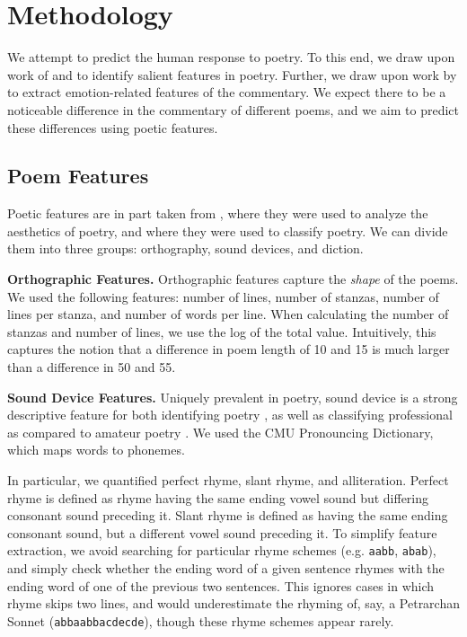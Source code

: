 \documentclass[11pt]{article}
\newcommand{\slimparagraph}[1]{
\vspace{4pt} %
\textbf{#1.}\quad}
\begin{document}
\section{Methodology}
We attempt to predict the human response to poetry. To this end, we draw upon work of  and  to identify salient features in poetry. Further, we draw upon work by  to extract emotion-related features of the commentary. We expect there to be a noticeable difference in the commentary of different poems, and we aim to predict these differences using poetic features.

\subsection{Poem Features}
Poetic features are in part taken from , where they were used to analyze the aesthetics of poetry, and  where they were used to classify poetry. We can divide them into three groups: orthography, sound devices, and diction.

\slimparagraph{Orthographic Features}
Orthographic features capture the \emph{shape} of the poems. We used the following features: number of lines, number of stanzas, number of lines per stanza, and number of words per line. When calculating the number of stanzas and number of lines, we use the log of the total value. Intuitively, this captures the notion that a difference in poem length of 10 and 15 is much larger than a difference in 50 and 55.

\slimparagraph{Sound Device Features}
Uniquely prevalent in poetry, sound device is a strong descriptive feature for both identifying poetry \cite{tizhoosh2008poetic}, as well as classifying professional as compared to amateur poetry \cite{kao2012computational}. We used the CMU Pronouncing Dictionary, which maps words to phonemes.

In particular, we quantified perfect rhyme, slant rhyme, and alliteration. Perfect rhyme is defined as rhyme having the same ending vowel sound but differing consonant sound preceding it. Slant rhyme is defined as having the same ending consonant sound, but a different vowel sound preceding it. To simplify feature extraction, we avoid searching for particular rhyme schemes (e.g. {\tt aabb}, {\tt abab}), and simply check whether the ending word of a given sentence rhymes with the ending word of one of the previous two sentences. This ignores cases in which rhyme skips two lines, and would underestimate the rhyming of, say, a Petrarchan Sonnet ({\tt abbaabbacdecde}), though these rhyme schemes appear rarely.
\end{document}

